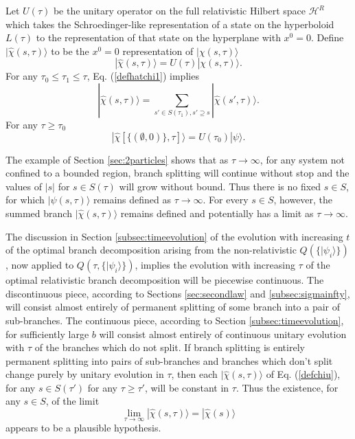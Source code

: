 \documentclass[twocolumn,amsmath,amssymb]{revtex4-1}
\begin{document}
Let $U(\tau)$ be the unitary operator on the
full relativistic Hilbert space $\mathcal{H}^R$ which takes
the Schroedinger-like representation of a state on the hyperboloid
$L(\tau)$ to the representation of that state
on the hyperplane with $x^0 = 0$.
Define $|\hat{\chi}(s, \tau) \rangle $ to be
the $x^0 = 0$ representation
of $|\chi( s, \tau) \rangle $
  \begin{equation}
    \label{defchiu}
    |\hat{\chi}( s, \tau) \rangle  =  U(\tau) |\chi( s, \tau) \rangle .
  \end{equation}
For any $\tau_0 \le \tau_1 \le \tau$,  
Eq. (\ref{defhatchi1}) implies
\begin{equation}
  \label{defhatchi2}
  |\hat{\chi}(s, \tau) \rangle  = \sum_{s' \in S(\tau_1), s' \supseteq s}| \hat{\chi}( s', \tau) \rangle .
\end{equation}
For any $\tau \ge \tau_0$
\begin{equation}
  \label{psih}
  |\hat{\chi}[ \{( \emptyset, 0)\}, \tau] \rangle  = U(\tau_0) |\psi \rangle .
\end{equation}



The example of Section \ref{sec:2particles}
shows that as $\tau \rightarrow \infty$, for any system
not confined to a bounded region, branch splitting
will continue without stop and the
values of $|s|$ for $s \in S(\tau)$ will
grow without bound. Thus there is no fixed $s \in S$,
for which $|\psi( s, \tau) \rangle $ remains defined as
$\tau \rightarrow \infty$.
For every $s \in S$, however, the summed branch
$|\hat\chi( s, \tau) \rangle $ remains defined and 
potentially has a limit as $\tau \rightarrow \infty$.

The discussion in
Section \ref{subsec:timeevolution} of the evolution
with increasing $t$
of the optimal branch decomposition arising from 
the non-relativistic $Q(\{|\psi_i \rangle \})$, now
applied to $Q(\tau, \{|\psi_i \rangle \})$, implies
the evolution with increasing $\tau$
of the optimal relativistic branch decomposition
will be piecewise continuous.
The discontinuous piece, according to
Sections \ref{sec:secondlaw} and \ref{subsec:sigmainfty},
will consist almost entirely of permanent
splitting of some branch into a pair of
sub-branches. The continuous
piece, according to Section \ref{subsec:timeevolution},
for sufficiently large $b$
will consist almost entirely of continuous unitary
evolution with $\tau$ of the branches which do not split.
If branch splitting is entirely permanent splitting
into pairs of sub-branches and branches which
don't split change purely by unitary evolution in
$\tau$, then each $|\hat{\chi}(s, \tau) \rangle $ of
Eq. (\ref{defchiu}),
for any $s \in S( \tau')$ for any $\tau \ge \tau'$, will be
constant in $\tau$.
Thus the existence, for any $s \in S$, of the limit
\begin{equation}
  \label{chihat}
  \lim_{\tau \rightarrow \infty} |\hat{\chi}(s, \tau) \rangle  = |\hat{\chi}(s) \rangle 
\end{equation}
appears to be a plausible hypothesis.
\end{document}
